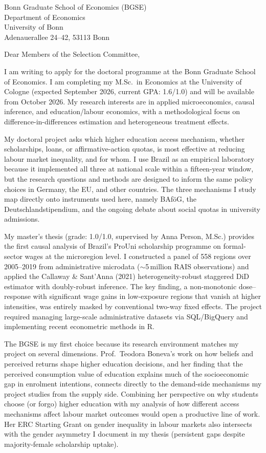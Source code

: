\documentclass[a4paper,11pt]{letter}
\begin{document}
\begin{letter}{%
    Bonn Graduate School of Economics (BGSE) \\
    Department of Economics \\
    University of Bonn \\
    Adenauerallee 24--42, 53113 Bonn
}

\opening{Dear Members of the Selection Committee,}

I am writing to apply for the doctoral programme at the Bonn Graduate School of Economics. I am completing my M.Sc.\ in Economics at the University of Cologne (expected September 2026, current GPA: 1.6/1.0) and will be available from October 2026. My research interests are in applied microeconomics, causal inference, and education/labour economics, with a methodological focus on difference-in-differences estimation and heterogeneous treatment effects.

My doctoral project asks which higher education access mechanism, whether scholarships, loans, or affirmative-action quotas, is most effective at reducing labour market inequality, and for whom. I use Brazil as an empirical laboratory because it implemented all three at national scale within a fifteen-year window, but the research questions and methods are designed to inform the same policy choices in Germany, the EU, and other countries. The three mechanisms I study map directly onto instruments used here, namely BAf\"oG, the Deutschlandstipendium, and the ongoing debate about social quotas in university admissions.

My master's thesis (grade: 1.0/1.0, supervised by Anna Person, M.Sc.) provides the first causal analysis of Brazil's ProUni scholarship programme on formal-sector wages at the microregion level. I constructed a panel of 558 regions over 2005--2019 from administrative microdata ($\sim$5\,million RAIS observations) and applied the Callaway \& Sant'Anna (2021) heterogeneity-robust staggered DiD estimator with doubly-robust inference. The key finding, a non-monotonic dose--response with significant wage gains in low-exposure regions that vanish at higher intensities, was entirely masked by conventional two-way fixed effects. The project required managing large-scale administrative datasets via SQL/BigQuery and implementing recent econometric methods in R.

The BGSE is my first choice because its research environment matches my project on several dimensions. Prof.\ Teodora Boneva's work on how beliefs and perceived returns shape higher education decisions, and her finding that the perceived consumption value of education explains much of the socioeconomic gap in enrolment intentions, connects directly to the demand-side mechanisms my project studies from the supply side. Combining her perspective on why students choose (or forgo) higher education with my analysis of how different access mechanisms affect labour market outcomes would open a productive line of work. Her ERC Starting Grant on gender inequality in labour markets also intersects with the gender asymmetry I document in my thesis (persistent gaps despite majority-female scholarship uptake).


\end{letter}
\end{document}

